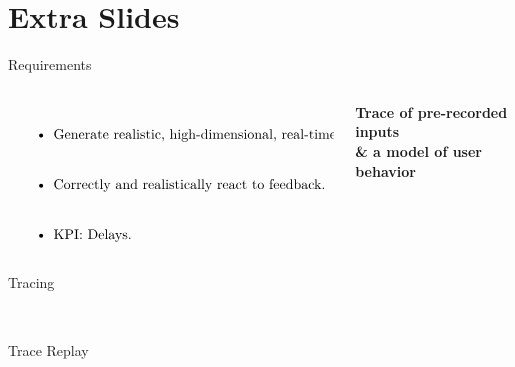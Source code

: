 \documentclass[aspectratio=1610]{beamer}
\begin{document}
\normalpage
\section{Extra Slides}
\begin{frame}{Requirements}
    \begin{columns}[onlytextwidth]
        \begin{column}{.5\linewidth}
            $\left.
                \begin{tabular}{p{.8\linewidth}}
                    \begin{itemize}
                        \itemsep2em
                        \item Generate realistic, high-dimensional, real-time inputs.
                        \item Correctly and realistically react to feedback.
                        \item KPI: Delays.
                    \end{itemize}
                \end{tabular}%
                \right\}$
        \end{column}%
        \begin{column}{.5\linewidth}
            \centering%
            \Large\bfseries%
            Trace of pre-recorded inputs\\
            \& a model of user behavior\\
        \end{column}
    \end{columns}
\end{frame}

\begin{frame}{Tracing}
    \begin{center}
        \\
    \end{center}
\end{frame}

\begin{frame}{Trace Replay}
    \begin{center}
        \\
    \end{center}
\end{frame}
\end{document}
